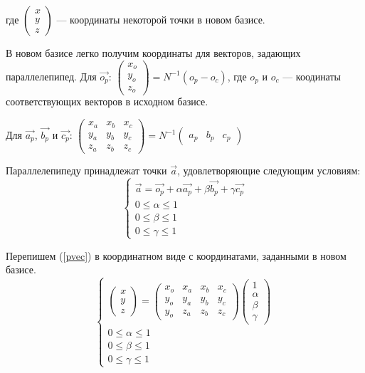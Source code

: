 \documentclass[pdftex,ptm,12pt,a4paper]{report}
\begin{document}
      где $\begin{pmatrix} x \\ y \\ z \end{pmatrix}$ --- координаты некоторой точки в новом базисе.

      В новом базисе легко получим координаты для векторов, задающих параллелепипед.
      Для $\vec{o_p}$:
      $\begin{pmatrix} x_o \\ y_o \\ z_o \end{pmatrix} =  N^{-1} (o_p - o_c) $, где $o_p$ и $o_c$ --- коодинаты соответствующих векторов в исходном базисе.

      Для $\vec{a_p}$, $\vec{b_p}$ и $\vec{c_p}$:
      $\begin{pmatrix} x_a & x_b & x_c \\ y_a & y_b & y_c  \\ z_a & z_b & z_c \end{pmatrix} =
      N^{-1} \begin{pmatrix} a_p & b_p  & c_p \end{pmatrix}$

      Параллелепипеду принадлежат точки $\vec{a}$, удовлетворяющие следующим условиям:
      \begin{equation}\label{pvec}
        \begin{cases}
          \vec{a} = \vec{o_p} + \alpha \vec{a_p} + \beta \vec{b_p} + \gamma \vec{c_p} \\
          0 \le  \alpha   \le  1 \\
          0 \le  \beta   \le  1 \\
          0 \le  \gamma   \le  1
        \end{cases}
      \end{equation}

      Перепишем (\ref{pvec}) в координатном виде с координатами, заданными в новом базисе.
      \begin{equation}\label{pcoord}
        \begin{cases}
          \begin{pmatrix} x \\ y \\ z \end{pmatrix}
          =
          \begin{pmatrix} x_o & x_a & x_b & x_c \\ y_o & y_a & y_b & y_c  \\ y_o & z_a & z_b & z_c
          \end{pmatrix} \begin {pmatrix} 1 \\ \alpha \\ \beta \\ \gamma \end{pmatrix} \\
          0 \le  \alpha   \le  1 \\
          0 \le  \beta   \le  1 \\
          0 \le  \gamma   \le  1
        \end{cases}
      \end{equation}
\end{document}
